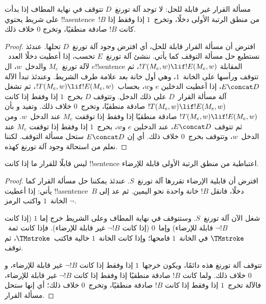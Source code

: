 \documentclass[../../../include/open-logic-section]{subfiles}
\begin{document}

\begin{thm}
مسألة القرار غير قابلة للحل: لا توجد آلة تورنغ~$D$ تتوقف في نهاية
المطاف إذا بدأت على شريط يحتوي !!a{sentence}~$!B$ من منطق الرتبة
الأولى دخلًا، وتخرج~$1$ إذا وفقط إذا كانت $!B$ صادقة منطقيًا، وتخرج
$0$ خلاف ذلك.
\end{thm}

\begin{proof}
افترض أن مسألة القرار قابلة للحل، أي افترض وجود آلة تورنغ~$D$ تحلها.
عندئذ نستطيع حل مسألة التوقف كما يأتي. ننشئ آلة تورنغ~$E$ تحسب، إذا
  أعطيت دخلًا العدد~$e$ لآلة تورنغ~$M_e$ والدخل~$w$، ال!!{sentence}
  المقابلة $!T(M_e,w)\lif !E(M_e,w)$، ثم تتوقف ورأسها على الخانة~$1$،
  وهي أول خانة بعد علامة طرف الشريط. وعندئذ تبدأ الآلة $E\concat D$، إذا أعطيت
الدخلين $e$ و$w$، بحساب~$!T(M_e,w)\lif !E(M_e,w)$، ثم تشغل آلة
مسألة القرار~$D$ على ذلك الدخل. وتتوقف $D$ بخرج~$1$ إذا وفقط إذا
كانت $!T(M_e,w)\lif !E(M_e,w)$ صادقة منطقيًا، وتخرج~$0$ خلاف ذلك.
وتفيد  و
 بأن $!T(M_e,w)\lif !E(M_e,w)$ صادقة
منطقيًا إذا وفقط إذا توقفت $M_e$ عند الدخل~$w$. ومن ثم تتوقف
$E\concat D$، عند الدخلين $e$ و$w$، بخرج~$1$ إذا وفقط إذا توقفت
$M_e$ عند الدخل~$w$، وتتوقف بخرج~$0$ خلاف ذلك. أي إن
$E\concat D$ ستحل مسألة التوقف. لكننا نعلم من
   استحالة وجود آلة تورنغ كهذه.
\end{proof}

\begin{cor}%
ليس قابلًا للقرار ما إذا كانت !!{sentence} اعتباطية من منطق الرتبة
الأولى قابلة للإرضاء.
\end{cor}

\begin{proof}
  افترض أن قابلية الإرضاء تقررها آلة تورنغ~$S$. عندئذ يمكننا حل
  مسألة القرار كما يأتي: إذا أعطيت !!a{sentence}~$B$ دخلًا، فانقل
  $!B$ خانة واحدة نحو اليمين. ثم عد إلى الخانة~$1$ واكتب الرمز
  $\lnot$.

  شغل الآن آلة تورنغ~$S$. وستتوقف في نهاية المطاف وعلى الشريط خرج
  إما $1$ (إذا كانت $\lnot !B$ قابلة للإرضاء) وإما~$0$ (إذا كانت
  $\lnot !B$ غير قابلة للإرضاء). فإذا كانت ثمة~$\TMstroke$ في
  الخانة~$1$ فامحها؛ وإذا كانت الخانة~$1$ خالية فاكتب~$\TMstroke$،
  ثم توقف.

  تتوقف آلة تورنغ هذه دائمًا، ويكون خرجها~$1$ إذا وفقط إذا كانت
  $\lnot !B$ غير قابلة للإرضاء، و$0$ خلاف ذلك. ولما كانت $!B$ صادقة
  منطقيًا إذا وفقط إذا كانت $\lnot !B$ غير قابلة للإرضاء، فالآلة
  تخرج~$1$ إذا وفقط إذا كانت $!B$ صادقة منطقيًا، وتخرج~$0$ خلاف
  ذلك؛ أي إنها ستحل مسألة القرار.
\end{proof}
\end{document}
